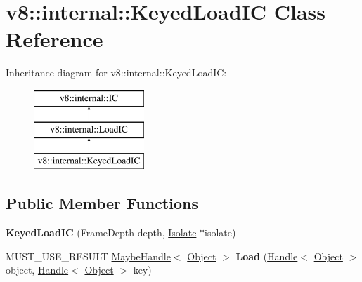 \hypertarget{classv8_1_1internal_1_1_keyed_load_i_c}{}\section{v8\+:\+:internal\+:\+:Keyed\+Load\+I\+C Class Reference}
\label{classv8_1_1internal_1_1_keyed_load_i_c}
Inheritance diagram for v8\+:\+:internal\+:\+:Keyed\+Load\+I\+C\+:\begin{figure}[H]
\begin{center}
\leavevmode
\includegraphics[height=3.000000cm]{classv8_1_1internal_1_1_keyed_load_i_c}
\end{center}
\end{figure}
\subsection*{Public Member Functions}
\begin{DoxyCompactItemize}
\item 
\hypertarget{classv8_1_1internal_1_1_keyed_load_i_c_a58bfb02ae8fe5f8dce6000c2c1fd2ffa}{}{\bfseries Keyed\+Load\+I\+C} (Frame\+Depth depth, \hyperlink{classv8_1_1internal_1_1_isolate}{Isolate} $\ast$isolate)\label{classv8_1_1internal_1_1_keyed_load_i_c_a58bfb02ae8fe5f8dce6000c2c1fd2ffa}

\item 
\hypertarget{classv8_1_1internal_1_1_keyed_load_i_c_a0fb4a0354f4a4be12080a71e9560a676}{}M\+U\+S\+T\+\_\+\+U\+S\+E\+\_\+\+R\+E\+S\+U\+L\+T \hyperlink{classv8_1_1internal_1_1_maybe_handle}{Maybe\+Handle}$<$ \hyperlink{classv8_1_1internal_1_1_object}{Object} $>$ {\bfseries Load} (\hyperlink{classv8_1_1internal_1_1_handle}{Handle}$<$ \hyperlink{classv8_1_1internal_1_1_object}{Object} $>$ object, \hyperlink{classv8_1_1internal_1_1_handle}{Handle}$<$ \hyperlink{classv8_1_1internal_1_1_object}{Object} $>$ key)\label{classv8_1_1internal_1_1_keyed_load_i_c_a0fb4a0354f4a4be12080a71e9560a676}

\end{DoxyCompactItemize}
